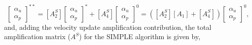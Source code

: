 \documentclass[final,3p,times,11pt,onecolumn]{myElsarticle}
\numberwithin{equation}{section}
\begin{document}
\begin{equation}
\begin{bmatrix}
\alpha_u \\
\alpha_p 
\end{bmatrix}^{**} =
[A^S_2]
\begin{bmatrix}
\alpha_u \\
\alpha_p 
\end{bmatrix}^{*} +
[A^S_4]
\begin{bmatrix}
\alpha_u \\
\alpha_p 
\end{bmatrix}^{0} =
([A^S_2] [A_1] + [A^S_4])
\begin{bmatrix}
\alpha_u \\
\alpha_p 
\end{bmatrix}^{0},
\end{equation}
and, adding the velocity update amplification contribution, the total amplification matrix ($A^S$) for the SIMPLE algorithm is given by,
\end{document}
